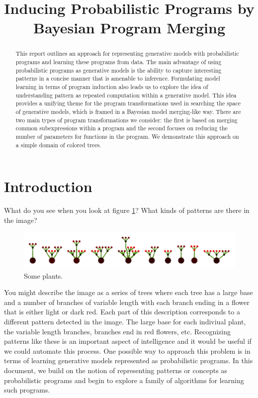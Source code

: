 \documentclass[a4paper,10pt]{article}
\begin{document}
\title{Inducing Probabilistic Programs by Bayesian Program Merging}
\date{}
\maketitle
\begin{abstract}
This report outlines an approach for representing generative models with probabilistic programs and learning these programs from data.  The main advantage of using probabilistic programs as generative models is the ability to capture interesting patterns in a concise manner that is amenable to inference.  Formulating model learning in terms of program induction also leads us to explore the idea of understanding pattern as repeated computation within a generative model.  This idea provides a unifying theme for the program transformations used in searching the space of generative models, which is framed in a Bayesian model merging-like way.  There are two main types of program transformations we consider: the first is based on merging common subexpressions within a program and the second focuses on reducing the number of parameters for functions in the program.  We demonstrate this approach on a simple domain of colored trees.
\end{abstract}
\section{Introduction}
What do you see when you look at figure \ref{fig:plants}? What kinds of patterns are there in the image? 
\begin{figure}[h]
\begin{center}
\includegraphics[scale=.60]{plants.pdf}
\end{center}
\label{fig:plants}
\caption{Some plants.}
\end{figure}

You might describe the image as a series of trees where each tree has a large base and a number of branches of variable length with each branch ending in a flower that is either light or dark red.  Each part of this description corresponds to a different pattern detected in the image.  The large base for each indiviual plant, the variable length branches, branches end in red flowers, etc.  Recognizing patterns like these is an important aspect of intelligence and it would be useful if we could automate this process.  One possible way to approach this problem is in terms of learning generative models represented as probabilistic programs.  In this document, we build on the notion of representing patterns or concepts as probabilistic programs \cite{A.Stuhlmueller:2010:6d11a} and begin to explore a family of algorithms for learning such programs.
\end{document}
